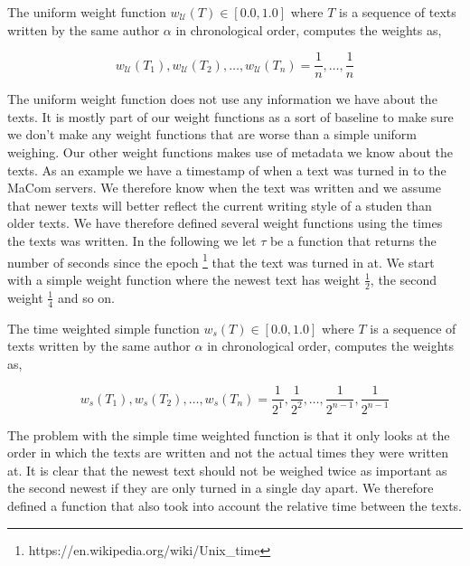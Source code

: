 \begin{definition}

    The uniform weight function $w_\mathcal{U}(T) \in [0.0, 1.0]$
    where $T$ is a sequence of texts written by the same author $\alpha$ in
    chronological order, computes the weights as,

    \begin{equation}
        w_\mathcal{U}(T_1), w_\mathcal{U}(T_2), \dots, w_\mathcal{U}(T_n) =
        \frac{1}{n}, \dots, \frac{1}{n}
    \end{equation}

\end{definition}

The uniform weight function does not use any information we have about the
texts. It is mostly part of our weight functions as a sort of baseline to
make sure we don't make any weight functions that are worse than a simple
uniform weighing. Our other weight functions makes use of metadata we know
about the texts. As an example we have a timestamp of when a text was turned
in to the MaCom servers. We therefore know when the text was written and
we assume that newer texts will better reflect the current writing style
of a studen than older texts. We have therefore defined several weight
functions using the times the texts was written. In the following we let
$\tau$ be a function that returns the number of seconds since the epoch
\footnote{https://en.wikipedia.org/wiki/Unix\_time} that the text was turned in
at. We start with a simple weight function where the newest text has weight
$\frac{1}{2}$, the second weight $\frac{1}{4}$ and so on.

\begin{definition}

    The time weighted simple function $w_s(T) \in [0.0, 1.0]$ where $T$ is a
    sequence of texts written by the same author $\alpha$ in chronological
    order, computes the weights as,

    \begin{equation}
        w_s(T_1), w_s(T_2), \dots, w_s(T_n) = \frac{1}{2^1}, \frac{1}{2^2},
        \dots, \frac{1}{2^{n-1}}, \frac{1}{2^{n-1}}
    \end{equation}

\end{definition}

The problem with the simple time weighted function is that it only looks at the
order in which the texts are written and not the actual times they were written
at. It is clear that the newest text should not be weighed twice as important as
the second newest if they are only turned in a single day apart. We therefore
defined a function that also took into account the relative time between the
texts.

